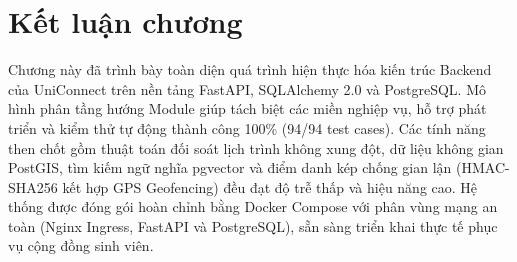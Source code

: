 \section{Kết luận chương}

Chương này đã trình bày toàn diện quá trình hiện thực hóa kiến trúc Backend của UniConnect trên nền tảng FastAPI, SQLAlchemy 2.0 và PostgreSQL. Mô hình phân tầng hướng Module giúp tách biệt các miền nghiệp vụ, hỗ trợ phát triển và kiểm thử tự động thành công 100\% (94/94 test cases). Các tính năng then chốt gồm thuật toán đối soát lịch trình không xung đột, dữ liệu không gian PostGIS, tìm kiếm ngữ nghĩa pgvector và điểm danh kép chống gian lận (HMAC-SHA256 kết hợp GPS Geofencing) đều đạt độ trễ thấp và hiệu năng cao. Hệ thống được đóng gói hoàn chỉnh bằng Docker Compose với phân vùng mạng an toàn (Nginx Ingress, FastAPI và PostgreSQL), sẵn sàng triển khai thực tế phục vụ cộng đồng sinh viên.


